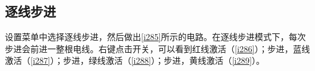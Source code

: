 \subsection{逐线步进}
设置菜单中选择逐线步进，然后做出\autoref{i285}所示的电路。在逐线步进模式下，每次步进会前进一整根电线。右键点击开关，可以看到红线激活（\autoref{i286}）；步进，蓝线激活（\autoref{i287}）；步进，绿线激活（\autoref{i288}）；步进，黄线激活（\autoref{i289}）。
\begin{figure}
\begin{center}
\qquad
{}
\qquad
{}
\qquad
{}
\qquad
{}
\end{center}
\caption{}
\end{figure}


